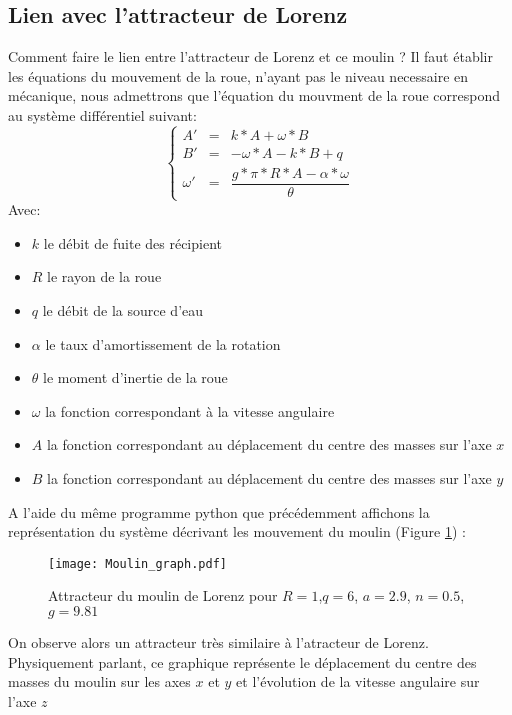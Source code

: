 \subsection{Lien avec l'attracteur de Lorenz}
Comment faire le lien entre l'attracteur de Lorenz et ce moulin ? Il faut établir les équations du mouvement de la roue, n'ayant pas le niveau necessaire en mécanique, nous admettrons que l'équation du mouvment de la roue correspond au système différentiel suivant:
\[
    \left\{
    \begin{array}{rcl}
        A'&=&k*A+\omega*B\\[12pt]
        B'&=&-\omega*A-k*B+q\\[12pt]
        \omega'&=&\dfrac{g*\pi*R*A-\alpha*\omega}{\theta }
    \end{array}
    \right.
\]
Avec: 
\begin{itemize}
    \item $k$ le débit de fuite des récipient
    \item $R$ le rayon de la roue
    \item $q$ le débit de la source d'eau
    \item $\alpha$ le taux d'amortissement de la rotation
    \item $\theta$ le moment d'inertie de la roue
    \item $\omega$ la fonction correspondant à la vitesse angulaire
    \item $A$ la fonction correspondant au déplacement du centre des masses sur l'axe $x$
    \item $B$ la fonction correspondant au déplacement du centre des masses sur l'axe $y$
\end{itemize}

A l'aide du même programme python que précédemment affichons la représentation du système décrivant les mouvement du moulin (Figure \ref{fig:moulin_graph}) :

\begin{figure}[!ht]
    \centering
    \texttt{[image: Moulin\_graph.pdf]}
    \caption{\label{fig:moulin_graph}Attracteur du moulin de Lorenz pour $R=1$,$q=6$, $a=2.9$, $n=0.5$, $g=9.81$ } 
\end{figure}

On observe alors un attracteur très similaire à l'atracteur de Lorenz. Physiquement parlant, ce graphique représente le déplacement du centre des masses du moulin sur les axes $x$ et $y$ et l'évolution de la vitesse angulaire sur l'axe $z$

